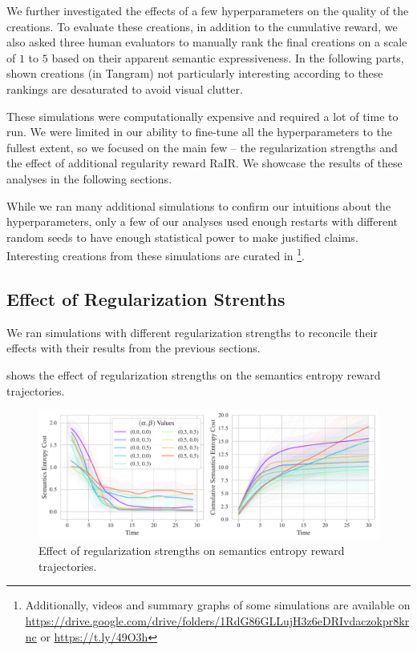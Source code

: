 We further investigated the effects of a few hyperparameters on the quality of the creations.
To evaluate these creations, in addition to the cumulative reward, we also asked three human evaluators to manually rank the final creations on a scale of \(1\) to \(5\) based on their apparent semantic expressiveness.
In the following parts, shown creations (in Tangram) not particularly interesting according to these rankings are desaturated to avoid visual clutter.

These simulations were computationally expensive and required a lot of time to run.
We were limited in our ability to fine-tune all the hyperparameters to the fullest extent, so we focused on the main few -- the regularization strengths and the effect of additional regularity reward RaIR.
We showcase the results of these analyses in the following sections.

While we ran many additional simulations to confirm our intuitions about the hyperparameters, only a few of our analyses used enough restarts with different random seeds to have enough statistical power to make justified claims.
Interesting creations from these simulations are curated in \footnote{Additionally, videos and summary graphs of some simulations are available on \url{https://drive.google.com/drive/folders/1RdG86GLLujH3z6eDRIvdaczokpr8krnc} or \url{https://t.ly/49O3h}}.


\subsection{Effect of Regularization Strenths}
\label{sec:alpha-beta-semantics}
We ran simulations with different regularization strengths to reconcile their effects with their results from the previous sections.

 shows the effect of regularization strengths on the semantics entropy reward trajectories.

\begin{figure}[h]
    \centering
    \includegraphics[width=\textwidth]{images/alpha_beta_comparison_rair.pdf}
    \caption{Effect of regularization strengths on semantics entropy reward trajectories.}
    \label{fig:alpha-beta-trajectories}
\end{figure}
\vspace{12pt}

